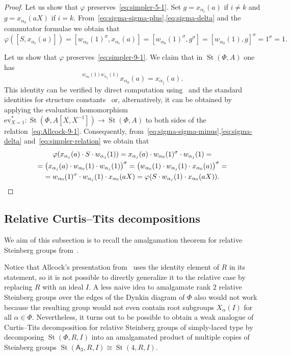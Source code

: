 \documentclass[oneside, 10pt]{amsart}
\DeclareMathOperator{\St}{St}
\newcommand{\rA}{\mathsf{A}}
\newcommand{\inv}{^{-1}}
\numberwithin{equation}{section}
\numberwithin{thm}{section}
\numberwithin{lemma}{section}
\theoremstyle{definition}
\theoremstyle{remark}
\begin{document}
\begin{proof}
Let us show that $\varphi$ preserves~\eqref{eq:simpler-5-1}.
Set $g = x_{\alpha_i}(a)$ if $i \neq k$ and $g = x_{\alpha_k}(aX)$ if $i = k$.
From~\eqref{eq:sigma-sigma-plus},\eqref{eq:sigma-delta} and the commutator formulae we obtain that
\begin{equation*}
\varphi([S, x_{\alpha_i}(a)]) = [w_{\alpha_0}(1)^\sigma, x_{\alpha_i}(a)] = [w_{\alpha_0}(1)^\sigma, g^\sigma] = [w_{\alpha_0}(1), g]^\sigma = 1^\sigma = 1.
\end{equation*}

Let us show that $\varphi$ preserves~\eqref{eq:simpler-9-1}.
We claim that in $\St(\Phi, A)$ one has
\begin{equation} \label{eq:simpler-relation} {}^{w_{\alpha_0}(1) w_{\alpha_j}(1)} x_{\alpha_0}(a) = x_{\alpha_j}(a). \end{equation}
This identity can be verified by direct computation using~\cite[Lemma~5.1]{Ma69} and the standard identities for structure constants~\cite[\S~14]{VP} or,
alternatively, it can be obtained by applying the evaluation homomorphism
$\mathrm{ev}_{X=1}^*\colon \St(\Phi, A[X, X\inv]) \to \St(\Phi, A)$ to both sides of the relation~\eqref{eq:Allcock-9-1}.
Consequently, from~\eqref{eq:sigma-sigma-minus},\eqref{eq:sigma-delta} and~\eqref{eq:simpler-relation} we obtain that
\begin{multline*}
\varphi(x_{\alpha_j}(a) \cdot S \cdot w_{\alpha_j}(1)) = x_{\alpha_j}(a) \cdot w_{\alpha_0}(1)^\sigma \cdot w_{\alpha_j}(1) = \\
= \left(x_{\alpha_j}(a) \cdot w_{\alpha_0}(1) \cdot w_{\alpha_j}(1)\right)^\sigma = \left(w_{\alpha_0}(1) \cdot w_{\alpha_j}(1) \cdot x_{\alpha_0}(a)\right)^\sigma = \\
= w_{\alpha_0}(1)^\sigma \cdot w_{\alpha_j}(1) \cdot x_{\alpha_0}(aX) = \varphi(S \cdot w_{\alpha_j}(1) \cdot x_{\alpha_0}(aX)). \qedhere
\end{multline*}
\end{proof}

\subsection{Relative Curtis--Tits decompositions}
We aim of this subsection is to recall the amalgamation theorem for relative Steinberg groups from~\cite{S15}.

Notice that Allcock's presentation from~\cite{A16, A13} uses the identity element of $R$ in its statement,
so it is not possible to directly generalize it to the relative case by replacing $R$ with an ideal $I$.
A less naive idea to amalgamate rank $2$ relative Steinberg groups over the edges of the Dynkin diagram of $\Phi$ also would not work
because the resulting group would not even contain root subgroups $X_\alpha(I)$ for all $\alpha \in \Phi$.
Nevertheless, it turns out to be possible to obtain a weak analogue of Curtis--Tits decomposition for relative Steinberg groups of simply-laced type
by decomposing $\St(\Phi, R, I)$ into an amalgamated product of multiple copies of Steinberg groups $\St(\rA_3, R, I) \cong \St(4, R, I)$.
\end{document}
